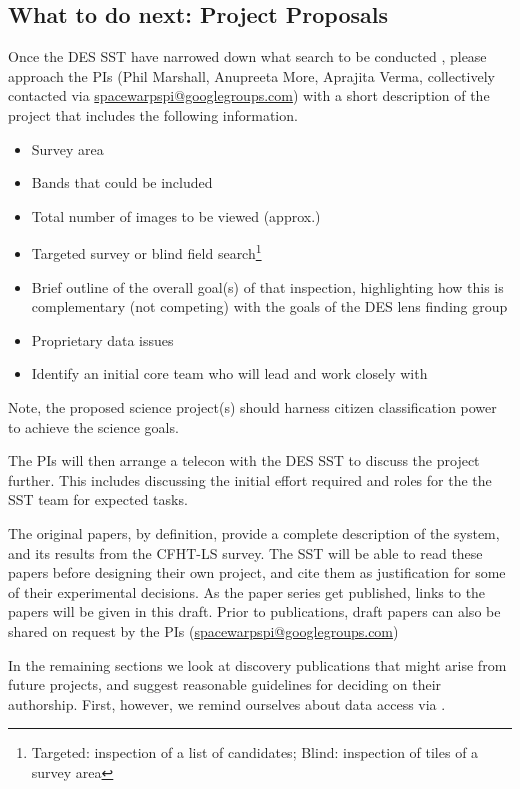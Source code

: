 \documentclass[a4paper,twocolumn]{article}
\begin{document}
\subsection{What to do next: Project Proposals}
Once the DES SST have narrowed down what search to be conducted \SW, please approach the \SW PIs (Phil Marshall, Anupreeta More, Aprajita Verma, collectively contacted via \href{mailto:spacewarpspi@googlegroups.com}{spacewarpspi@googlegroups.com}) with a short description of the project that includes the following information.

\begin{itemize}
\item Survey area
\item Bands that could be included
\item Total number of images to be viewed (approx.)
\item Targeted survey or blind field search\footnote{Targeted: inspection of a list of candidates; Blind: inspection of tiles of a survey area}
\item Brief outline of the overall goal(s) of that inspection, highlighting how this is complementary (not competing) with the goals of the DES lens finding group
\item Proprietary data issues 
\item Identify an initial core team who will lead and work closely with \SW
\end{itemize}

Note, the proposed science project(s) should harness citizen classification power to achieve the science goals.

The \SW PIs will then arrange a telecon with the DES SST to discuss the project further. This includes discussing the initial effort required and roles for the the SST team for expected tasks.

The original \SW papers, by definition, provide a complete description of the system, and its results from the CFHT-LS survey. The SST will be able
to read these papers before designing their own \SW project, and cite them as justification for some of their experimental decisions. As the \SW paper series get published, links to the papers will be given in this draft. Prior to publications, draft papers can also be shared on request by the \SW PIs (\href{mailto:spacewarpspi@googlegroups.com}{spacewarpspi@googlegroups.com})


In the remaining sections we look at discovery publications that might
arise from future \SW projects, and suggest reasonable guidelines for
deciding on their authorship. First, however, we remind ourselves about data
access via \SW.
\end{document}

